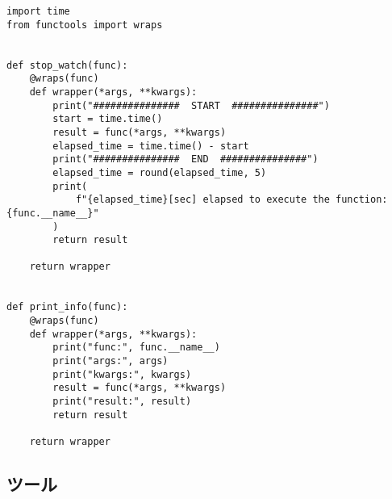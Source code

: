 \begin{lstlisting}[caption=decorators.py,label=decorators.py]
import time
from functools import wraps


def stop_watch(func):
    @wraps(func)
    def wrapper(*args, **kwargs):
        print("###############  START  ###############")
        start = time.time()
        result = func(*args, **kwargs)
        elapsed_time = time.time() - start
        print("###############  END  ###############")
        elapsed_time = round(elapsed_time, 5)
        print(
            f"{elapsed_time}[sec] elapsed to execute the function:{func.__name__}"
        )
        return result

    return wrapper


def print_info(func):
    @wraps(func)
    def wrapper(*args, **kwargs):
        print("func:", func.__name__)
        print("args:", args)
        print("kwargs:", kwargs)
        result = func(*args, **kwargs)
        print("result:", result)
        return result

    return wrapper
\end{lstlisting}

\subsection{ツール}

